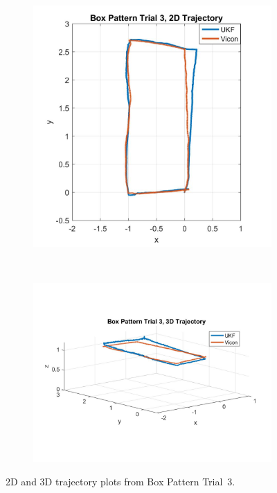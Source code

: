 \begin{figure}
    \centering
    \begin{subfigure}{0.4\textwidth}
        \includegraphics[width=\textwidth,left]{box3_2d}
    \end{subfigure}%
    ~ 
    \begin{subfigure}{0.6\textwidth}
        \centering
        \includegraphics[width=\textwidth,right]{box3_3d}
    \end{subfigure}
    \caption[Box Pattern Trial 3 Trajectory]{2D and 3D trajectory plots from Box Pattern Trial~3.}
    \label{box3_traj}
\end{figure}

